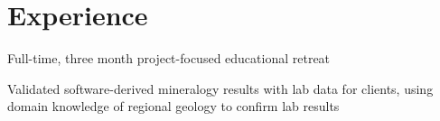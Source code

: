 \documentclass[letterpaper]{deedy-resume} %
\begin{document}
\begin{minipage}[t]{0.33\textwidth}



\end{minipage} %
\hfill
%
%
\begin{minipage}[t]{0.66\textwidth} %


\section{Experience}


\vspace{\topsep} %
\begin{tightitemize}
\item Full-time, three month project-focused educational retreat  \\
\end{tightitemize}

\sectionspace %



\begin{tightitemize}
\item Validated software-derived mineralogy results with lab data for clients, using domain knowledge of regional geology to confirm lab results
\end{tightitemize}


\end{minipage}
\end{document}
